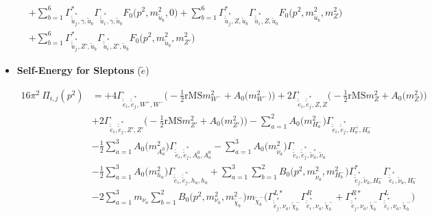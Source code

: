 \begin{itemize}
\begin{align}
 &+\sum_{b=1}^{6}{\Gamma^*_{\check{\tilde{u}}^*_{{j}},\gamma,\tilde{u}_{{b}}}} {\Gamma_{\check{\tilde{u}}^*_{{i}},\gamma,\tilde{u}_{{b}}}} {F_0\Big(p^{2},m^2_{\tilde{u}_{{b}}},0\Big)} +\sum_{b=1}^{6}{\Gamma^*_{\check{\tilde{u}}^*_{{j}},Z,\tilde{u}_{{b}}}} {\Gamma_{\check{\tilde{u}}^*_{{i}},Z,\tilde{u}_{{b}}}} {F_0\Big(p^{2},m^2_{\tilde{u}_{{b}}},m^2_{Z}\Big)} \nonumber \\ 
 &+\sum_{b=1}^{6}{\Gamma^*_{\check{\tilde{u}}^*_{{j}},{Z'},\tilde{u}_{{b}}}} {\Gamma_{\check{\tilde{u}}^*_{{i}},{Z'},\tilde{u}_{{b}}}} {F_0\Big(p^{2},m^2_{\tilde{u}_{{b}}},m^2_{{Z'}}\Big)}  
\end{align} 
\item {\bf Self-Energy for Sleptons} \thickspace (\(\tilde{e}\)) 

\begin{align} 
16\pi^2 \ \Pi_{i,j}(p^2) &= +4 {\Gamma_{\check{\tilde{e}}_{{i}},\check{\tilde{e}}^*_{{j}},W^+,W^-}} \Big(-\frac{1}{2} \text{rMS} m^2_{W^-}  + {A_0\Big(m^2_{W^-}\Big)}\Big)+2 {\Gamma_{\check{\tilde{e}}_{{i}},\check{\tilde{e}}^*_{{j}},Z,Z}} \Big(-\frac{1}{2} \text{rMS} m^2_{Z}  + {A_0\Big(m^2_{Z}\Big)}\Big)\nonumber \\ 
 &+2 {\Gamma_{\check{\tilde{e}}_{{i}},\check{\tilde{e}}^*_{{j}},{Z'},{Z'}}} \Big(-\frac{1}{2} \text{rMS} m^2_{{Z'}}  + {A_0\Big(m^2_{{Z'}}\Big)}\Big)- \sum_{a=1}^{2}{A_0\Big(m^2_{H^-_{{a}}}\Big)} {\Gamma_{\check{\tilde{e}}_{{i}},\check{\tilde{e}}^*_{{j}},H^+_{{a}},H^-_{{a}}}}  \nonumber \\ 
 &-\frac{1}{2} \sum_{a=1}^{3}{A_0\Big(m^2_{A^0_{{a}}}\Big)} {\Gamma_{\check{\tilde{e}}_{{i}},\check{\tilde{e}}^*_{{j}},A^0_{{a}},A^0_{{a}}}}  - \sum_{a=1}^{3}{A_0\Big(m^2_{\tilde{\nu}_{{a}}}\Big)} {\Gamma_{\check{\tilde{e}}_{{i}},\check{\tilde{e}}^*_{{j}},\tilde{\nu}^*_{{a}},\tilde{\nu}_{{a}}}}  \nonumber \\ 
 &-\frac{1}{2} \sum_{a=1}^{3}{A_0\Big(m^2_{h_{{a}}}\Big)} {\Gamma_{\check{\tilde{e}}_{{i}},\check{\tilde{e}}^*_{{j}},h_{{a}},h_{{a}}}}  +\sum_{a=1}^{3}\sum_{b=1}^{2}{B_0\Big(p^{2},m^2_{\tilde{\nu}_{{a}}},m^2_{H^-_{{b}}}\Big)} {\Gamma^*_{\check{\tilde{e}}^*_{{j}},\tilde{\nu}_{{a}},H^-_{{b}}}} {\Gamma_{\check{\tilde{e}}^*_{{i}},\tilde{\nu}_{{a}},H^-_{{b}}}} \nonumber \\ 
 &-2 \sum_{a=1}^{3}m_{\nu_{{a}}} \sum_{b=1}^{2}{B_0\Big(p^{2},m^2_{\nu_{{a}}},m^2_{\tilde{\chi}^-_{{b}}}\Big)} m_{\tilde{\chi}^-_{{b}}} \Big({\Gamma^{L*}_{\check{\tilde{e}}^*_{{j}},\nu_{{a}},\tilde{\chi}^-_{{b}}}} {\Gamma^R_{\check{\tilde{e}}^*_{{i}},\nu_{{a}},\tilde{\chi}^-_{{b}}}}  + {\Gamma^{R*}_{\check{\tilde{e}}^*_{{j}},\nu_{{a}},\tilde{\chi}^-_{{b}}}} {\Gamma^L_{\check{\tilde{e}}^*_{{i}},\nu_{{a}},\tilde{\chi}^-_{{b}}}} \Big)  \nonumber \\ 

\end{align}
\end{itemize}
